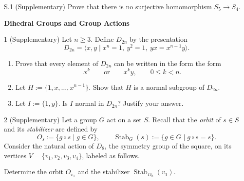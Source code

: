 \documentclass[11pt]{article}
\newcommand{\sectionheading}[1]{%
  \Needspace{8\baselineskip}
  \vspace{0.25em}
  {\color{darkgray}\large\bfseries #1}\par
}
\begin{document}
\begin{exercise}{S.1 (Supplementary)}
Prove that there is no surjective homomorphism $S_5\to S_4$.
\end{exercise}

\sectionheading{Dihedral Groups and Group Actions}

\begin{exercise}{1 (Supplementary)}
Let $n\geq3$. Define $D_{2n}$ by the presentation
\[
  D_{2n}=\langle x,y\mid x^n=1,\ y^2=1,\ yx=x^{n-1}y\rangle.
\]

\begin{enumerate}[label=\textbf{(\alph*)}]
	\item Prove that every element of $D_{2n}$ can be written in the form
	the form
	\[
	x^k \qquad\text{or}\qquad x^k y,
	\qquad 0\leq k<n.
	\] 
	\item Let $H:=\{1,x,\ldots,x^{n-1}\}$. Show that $H$ is a normal subgroup of $D_{2n}$.

	\item Let $I:=\{1,y\}$. Is $I$ normal in $D_{2n}$? Justify your answer.


	\end{enumerate}


\end{exercise}

\begin{exercise}{2 (Supplementary)}
Let a group $G$ act on a set $S$. Recall that the \emph{orbit} of
$s\in S$ and its \emph{stabilizer} are defined by
\[
  O_s:=\{g\circ s\mid g\in G\},
  \qquad
  \operatorname{Stab}_G(s):=\{g\in G\mid g\circ s=s\}.
\]
Consider the natural action of $D_8$, the symmetry group of the square,
on its vertices $V=\{v_1,v_2,v_3,v_4\}$, labeled as follows.
\begin{center}
\end{center}
Determine the orbit $O_{v_1}$ and the stabilizer
$\operatorname{Stab}_{D_8}(v_1)$.
\end{exercise}
\end{document}
